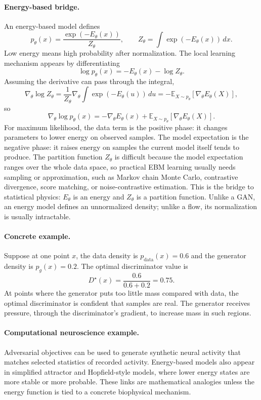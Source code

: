 \paragraph{Energy-based bridge.}
An energy-based model defines
\[
p_\theta(x)=\frac{\exp(-E_\theta(x))}{Z_\theta},
\qquad
Z_\theta=\int \exp(-E_\theta(x))\,dx.
\]
Low energy means high probability after normalization. The local learning mechanism appears by differentiating
\[
\log p_\theta(x)=-E_\theta(x)-\log Z_\theta.
\]
Assuming the derivative can pass through the integral,
\[
\nabla_\theta \log Z_\theta
=\frac{1}{Z_\theta}\nabla_\theta\int \exp(-E_\theta(u))\,du
=-\mathbb{E}_{X\sim p_\theta}\!\left[\nabla_\theta E_\theta(X)\right],
\]
so
\[
\boxed{
\nabla_\theta \log p_\theta(x)
=-\nabla_\theta E_\theta(x)
+\mathbb{E}_{X\sim p_\theta}\!\left[\nabla_\theta E_\theta(X)\right].
}
\]
For maximum likelihood, the data term is the positive phase: it changes parameters to lower energy on observed samples. The model expectation is the negative phase: it raises energy on samples the current model itself tends to produce. The partition function \(Z_\theta\) is difficult because the model expectation ranges over the whole data space, so practical EBM learning usually needs sampling or approximation, such as Markov chain Monte Carlo, contrastive divergence, score matching, or noise-contrastive estimation. This is the bridge to statistical physics: \(E_\theta\) is an energy and \(Z_\theta\) is a partition function. Unlike a GAN, an energy model defines an unnormalized density; unlike a flow, its normalization is usually intractable.

\paragraph{Concrete example.}
Suppose at one point \(x\), the data density is \(p_{\mathrm{data}}(x)=0.6\) and the generator density is \(p_g(x)=0.2\). The optimal discriminator value is
\[
D^\star(x)=\frac{0.6}{0.6+0.2}=0.75.
\]
At points where the generator puts too little mass compared with data, the optimal discriminator is confident that samples are real. The generator receives pressure, through the discriminator's gradient, to increase mass in such regions.

\paragraph{Computational neuroscience example.}
Adversarial objectives can be used to generate synthetic neural activity that matches selected statistics of recorded activity. Energy-based models also appear in simplified attractor and Hopfield-style models, where lower energy states are more stable or more probable. These links are mathematical analogies unless the energy function is tied to a concrete biophysical mechanism.

